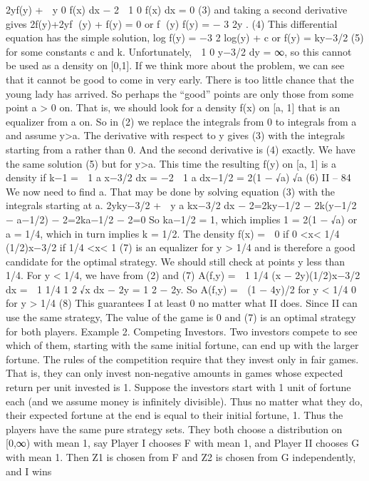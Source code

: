 2yf(y) +  y
0
f(x) dx − 2
 1
0
f(x) dx = 0 (3)
and taking a second derivative gives
2f(y)+2yf
(y) + f(y) = 0 or f
(y)
f(y) = − 3
2y
. (4)
This differential equation has the simple solution,
log f(y) = −3
2 log(y) + c or f(y) = ky−3/2 (5)
for some constants c and k. Unfortunately,  1
0 y−3/2 dy = ∞, so this cannot be used as a
density on [0,1].
If we think more about the problem, we can see that it cannot be good to come in very
early. There is too little chance that the young lady has arrived. So perhaps the “good”
points are only those from some point a > 0 on. That is, we should look for a density
f(x) on [a, 1] that is an equalizer from a on. So in (2) we replace the integrals from 0 to
integrals from a and assume y>a. The derivative with respect to y gives (3) with the
integrals starting from a rather than 0. And the second derivative is (4) exactly. We have
the same solution (5) but for y>a. This time the resulting f(y) on [a, 1] is a density if
k−1 =
 1
a
x−3/2 dx = −2
 1
a
dx−1/2 = 2(1 − √a)
√a (6)
II – 84
We now need to find a. That may be done by solving equation (3) with the integrals
starting at a.
2yky−3/2 +
 y
a
kx−3/2 dx − 2=2ky−1/2 − 2k(y−1/2 − a−1/2) − 2=2ka−1/2 − 2=0
So ka−1/2 = 1, which implies 1 = 2(1 − √a) or a = 1/4, which in turn implies k = 1/2.
The density
f(x) =  0 if 0 <x< 1/4
(1/2)x−3/2 if 1/4 <x< 1 (7)
is an equalizer for y > 1/4 and is therefore a good candidate for the optimal strategy. We
should still check at points y less than 1/4. For y < 1/4, we have from (2) and (7)
A(f,y) =  1
1/4
(x − 2y)(1/2)x−3/2 dx =
 1
1/4
1
2
√x
dx − 2y = 1
2 − 2y.
So
A(f,y) =  (1 − 4y)/2 for y < 1/4
0 for y > 1/4 (8)
This guarantees I at least 0 no matter what II does. Since II can use the same strategy,
The value of the game is 0 and (7) is an optimal strategy for both players.
Example 2. Competing Investors. Two investors compete to see which of them,
starting with the same initial fortune, can end up with the larger fortune. The rules of
the competition require that they invest only in fair games. That is, they can only invest
non-negative amounts in games whose expected return per unit invested is 1.
Suppose the investors start with 1 unit of fortune each (and we assume money is
infinitely divisible). Thus no matter what they do, their expected fortune at the end is
equal to their initial fortune, 1.
Thus the players have the same pure strategy sets. They both choose a distribution
on [0,∞) with mean 1, say Player I chooses F with mean 1, and Player II chooses G with
mean 1. Then Z1 is chosen from F and Z2 is chosen from G independently, and I wins
